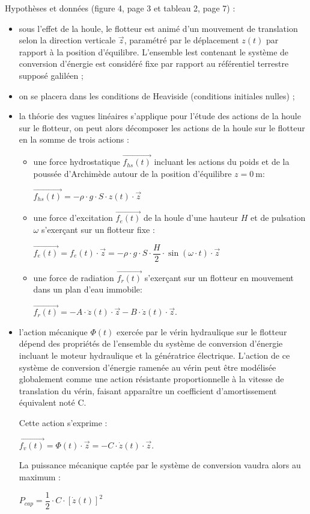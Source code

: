 Hypothèses et données (figure 4, page 3 et tableau 2, page 7) :
\begin{itemize}
 \item sous l'effet de la houle, le flotteur est animé d'un mouvement de translation selon la direction verticale $\vec{z}$, paramétré par le déplacement $z(t)$ par rapport à la position d'équilibre.
L'ensemble lest contenant le système de conversion d'énergie est considéré fixe par rapport au référentiel terrestre supposé galiléen ;
 \item on se placera dans les conditions de Heaviside (conditions initiales nulles) ;
 \item la théorie des vagues linéaires s'applique pour l'étude des actions de la houle sur le flotteur, on peut alors décomposer les actions de la houle sur le flotteur en la somme de trois actions :
 \begin{itemize}
 \item une force hydrostatique $\overrightarrow{f_{hs}(t)}$ incluant les actions du poids et de la poussée d'Archimède autour de la position d'équilibre $z = \SI{0}{\m}$:
 \begin{center}
	 $\overrightarrow{f_{hs}(t)}=-\rho\cdot g\cdot S\cdot z(t)\cdot\vec{z}$
 \end{center}
 \item une force d'excitation $\overrightarrow{f_{e}(t)}$ de la houle d'une hauteur $H$ et de pulsation $\omega$ s'exerçant sur un flotteur fixe :
 \begin{center}
	 $\overrightarrow{f_{e}(t)}=f_{e}(t)\cdot\vec{z}=-\rho\cdot g\cdot S\cdot \dfrac{H}{2}\cdot\sin(\omega\cdot t)\cdot\vec{z}$
 \end{center}
 \item une force de radiation $\overrightarrow{f_{r}(t)}$ s'exerçant sur un flotteur en mouvement dans un plan d'eau immobile:
  \begin{center}
	 $\overrightarrow{f_{r}(t)}=-A\cdot \ddot{z}(t)\cdot\vec{z}-B\cdot \dot{z}(t)\cdot\vec{z}$.
 \end{center}
 \end{itemize}
 \item l'action mécanique $\Phi(t)$ exercée par le vérin hydraulique sur le flotteur dépend des propriétés de l'ensemble du système de conversion d'énergie incluant le moteur hydraulique et la génératrice électrique. L'action de ce système de conversion d'énergie ramenée au vérin peut être modélisée globalement comme une action résistante proportionnelle à la vitesse de translation du vérin, faisant apparaître un coefficient d'amortissement équivalent noté C.

Cette action s'exprime :
  \begin{center}
	 $\overrightarrow{f_{v}(t)}=\Phi(t)\cdot\vec{z}=-C\cdot \dot{z}(t)\cdot\vec{z}$.
 \end{center}
La puissance mécanique captée par le système de conversion vaudra alors au maximum :
  \begin{center}
	 $P_{cap}=\dfrac{1}{2}\cdot C\cdot [\dot{z}(t)]^2$
 \end{center}
\end{itemize}

